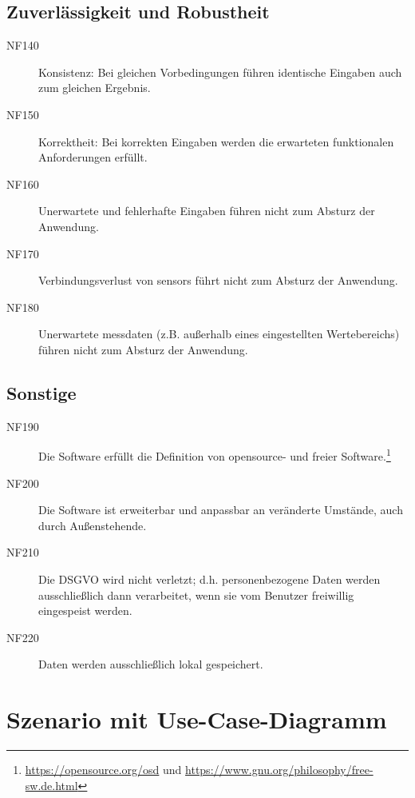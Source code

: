 \documentclass[parskip=full]{scrartcl}
\begin{document}
\subsection{Zuverlässigkeit und Robustheit}

\begin{description}

\item[NF140] Konsistenz: Bei gleichen Vorbedingungen führen identische Eingaben auch zum gleichen Ergebnis.
\item[NF150] Korrektheit: Bei korrekten Eingaben werden die erwarteten funktionalen Anforderungen erfüllt.
\item[NF160] Unerwartete und fehlerhafte Eingaben führen nicht zum Absturz der Anwendung.
\item[NF170] Verbindungsverlust von \glspl{sensor} führt nicht zum Absturz der Anwendung.
\item[NF180] Unerwartete \gls{messdaten} (z.B. außerhalb eines eingestellten Wertebereichs) führen nicht zum Absturz der Anwendung.

\end{description}

\subsection{Sonstige}

\begin{description}

\item[NF190] Die Software erfüllt die Definition von \gls{opensource}- und freier Software.\footnote{\url{https://opensource.org/osd} und \url{https://www.gnu.org/philosophy/free-sw.de.html}}
\item[NF200] Die Software ist erweiterbar und anpassbar an veränderte Umstände, auch durch Außenstehende.
\item[NF210] Die \gls{DSGVO} wird nicht verletzt; d.h. personenbezogene Daten werden ausschließlich dann verarbeitet, wenn sie vom Benutzer freiwillig eingespeist werden.
\item[NF220] Daten werden ausschließlich lokal gespeichert.

\end{description}

\clearpage
\section{Szenario mit Use-Case-Diagramm}\label{scenario}
\end{document}
